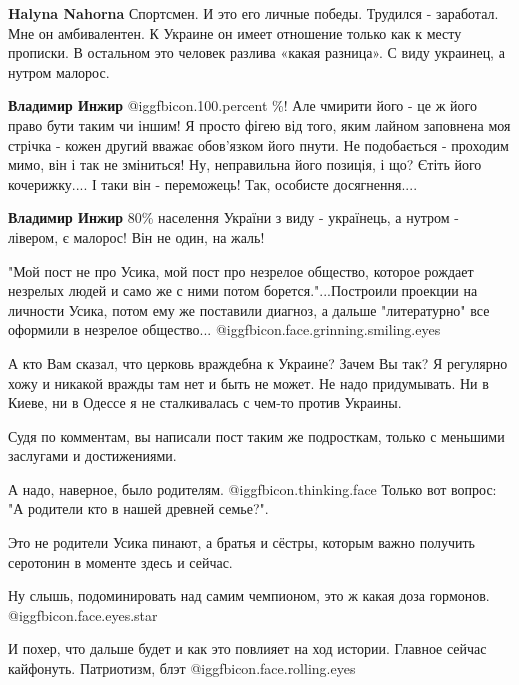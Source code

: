 \begin{itemize}
\begin{itemize}
\textbf{Halyna Nahorna} Спортсмен. И это его личные победы. Трудился - заработал. Мне он амбивалентен. К Украине он имеет отношение только как к месту прописки. В остальном это человек разлива «какая разница». С виду украинец, а нутром малорос.

\textbf{Владимир Инжир}  @igg{fbicon.100.percent} \%! Але чмирити його - це ж його право бути таким чи іншим! Я просто фігею від того, яким лайном заповнена моя стрічка - кожен другий вважає обов'язком його пнути. Не подобається - проходим мимо, він і так не зміниться!
Ну, неправильна його позиція, і що?
Єтіть його кочерижку....
І таки він - переможець! Так, особисте досягнення....

\textbf{Владимир Инжир} 80\% населення України з виду - українець, а нутром - лівером, є малорос! Він не один, на жаль!
\end{itemize} %


"Мой пост не про Усика, мой пост про незрелое общество, которое рождает
незрелых людей и само же с ними потом борется."...Построили проекции на
личности Усика, потом ему же поставили диагноз, а дальше "литературно" все
оформили в незрелое общество... @igg{fbicon.face.grinning.smiling.eyes} 



А кто Вам сказал, что церковь враждебна к Украине? Зачем Вы так? Я регулярно
хожу и никакой вражды там нет и быть не может. Не надо придумывать. Ни в Киеве,
ни в Одессе я не сталкивалась с чем-то против Украины.



Судя по комментам, вы написали пост таким же подросткам, только с меньшими
заслугами и достижениями.

А надо, наверное, было родителям. @igg{fbicon.thinking.face}  Только вот вопрос: "А родители кто в нашей
древней семье?".

Это не родители Усика пинают, а братья и сёстры, которым важно получить
серотонин в моменте здесь и сейчас.

Ну слышь, подоминировать над самим чемпионом, это ж какая доза гормонов. @igg{fbicon.face.eyes.star} 

И похер, что дальше будет и как это повлияет на ход истории. Главное сейчас
кайфонуть. Патриотизм, блэт @igg{fbicon.face.rolling.eyes} 



\end{itemize}
